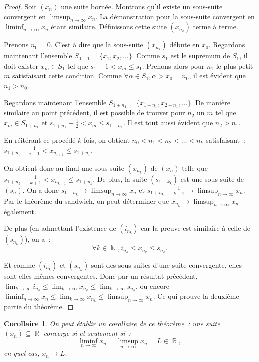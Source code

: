 \documentclass{article}
\DeclareMathOperator{\N}{\mathbb N}
\DeclareMathOperator{\R}{\mathbb R}
\newtheorem{cor}[thm]{Corollaire}
\theoremstyle{definition}
\theoremstyle{remark}
\begin{document}
		\begin{proof} Soit $(x_n)$ une suite bornée. Montrons qu'il existe un sous-suite convergent en $\limsup_{n\to\infty}x_n$. La démonstration
		pour la sous-suite convergent en $\liminf_{n\to\infty}x_n$ étant similaire. Définissons cette suite $(x_{n_k})$ terme à terme.

		Prenons $n_0 = 0$. C'est à dire que la sous-suite $(x_{n_k})$ débute en $x_0$. Regardons maintenant l'ensemble $S_{0+1} = \{x_1, x_2, \ldots\}$.
		Comme $s_1$ est le supremum de $S_1$, il doit exister $x_m \in S_1$ tel que $s_1-1 < x_m \leq s_1$. Prenons alors pour $n_1$ le plus petit $m$
		satisfaisant cette condition. Comme $\forall \alpha \in S_1, \alpha > x_0 = n_0$, il est évident que $n_1 > n_0$.

		Regardons maintenant l'ensemble $S_{1+n_1} = \{x_{1+n_1}, x_{2+n_1}, \ldots\}$. De manière similaire au point précédent, il est possible de trouver pour
		$n_2$ un $m$ tel que $x_m \in S_{1+n_1}$ et $s_{1+n_1}-\frac 12 < x_m \leq s_{1+n_1}$. Il est tout aussi évident que $n_2 > n_1$.

		En réitérant ce procédé $k$ fois, on obtient $n_0 < n_1 < n_2 <\ldots < n_k$ satisfaisant~: $s_{1+n_i} - \frac 1{i+1} < x_{n_{i+1}} \leq s_{1+n_i}$.

		On obtient donc au final une sous-suite $(x_{n_k})$ de $(x_n)$ telle que $s_{1+n_k} - \frac 1{k+1} < x_{n_{k+1}} \leq s_{1+n_k}$. De plus, la suite
		$(s_{1+k_k})$ est une sous-suite de $(s_n)$. On a donc $s_{1+n_k} \to \limsup_{n\to\infty}x_n$ et $s_{1+n_k} - \frac 1{k+1} \to \limsup_{n\to\infty}x_n$.
		Par le théorème du sandwich, on peut déterminer que $x_{n_k} \to \limsup_{n\to\infty}x_n$ également.

		De plus (en admettant l'existence de $(i_{n_k})$ car la preuve est similaire à celle de $(s_{n_k})$), on a~:
		\[\forall k \in \N, i_{n_k} \leq x_{n_k} \leq s_{n_k}.\]

		Et comme $(i_{n_k})$ et $(s_{n_k})$ sont des sous-suites d'une suite convergente, elles sont elles-mêmes convergentes. Donc par un résultat précédent,
		$\lim_{k\to\infty}i_{n_k} \leq \lim_{k\to\infty}x_{n_k} \leq \lim_{k\to\infty}s_{n_k}$, ou encore
		$\liminf_{n\to\infty}x_n \leq \lim_{k\to\infty}x_{n_k} \leq \limsup_{n\to\infty}x_n$. Ce qui prouve la deuxième partie du théorème. \end{proof}

		\begin{cor} On peut établir un corollaire de ce théorème~: une suite $(x_n) \subseteq \R$ converge si et seulement si~:
		\[\liminf_{n\to\infty}x_n = \limsup_{n\to\infty}x_n = L \in \R,\]
		en quel cas, $x_n \to L$. \end{cor}
\end{document}
